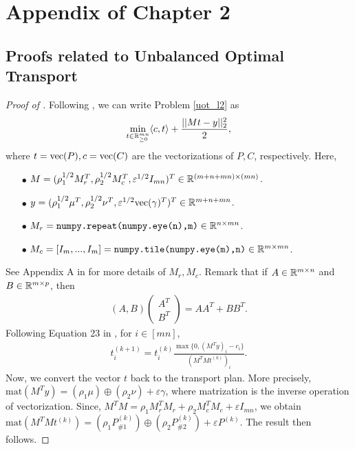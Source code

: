 \section{Appendix of Chapter 2}

\subsection{Proofs related to Unbalanced Optimal Transport} \label{appendix:subsec_uot}

\begin{proof}[Proof of ]
Following \citep{Chapel21}, we can write Problem \eqref{uot_l2} as
\begin{align}
    \min_{t \in \mathbb R^{mn}_{\geq 0}} \langle c, t \rangle + \frac{|| Mt - y ||_2^2}{2},
\end{align}
where $t = \text{vec}(P), c = \text{vec}(C)$ are the vectorizations of $P, C$, respectively. Here,
\begin{itemize}
    \item[$\bullet$] $M = (\rho_1^{1/2} M_r^T, \rho_2^{1/2} M_c^T, \varepsilon^{1/2} I_{mn})^T \in \mathbb R^{(m + n + mn) \times (mn)}$.

    \item[$\bullet$] $y = (\rho_1^{1/2} \mu^T, \rho_2^{1/2} \nu^T, \varepsilon^{1/2} \text{vec}(\gamma)^T)^T \in \mathbb R^{m + n + mn}$.

    \item[$\bullet$] $M_r = \texttt{numpy.repeat(numpy.eye(n),m)} \in \mathbb R^{n \times mn}$.

    \item[$\bullet$] $M_c = [I_m, ..., I_m] = \texttt{numpy.tile(numpy.eye(m),n)} \in \mathbb R^{m \times mn}$.
\end{itemize}
See Appendix A in \citep{Chapel21} for more details of $M_r, M_c$.
Remark that if $A \in \mathbb R^{m \times n}$ and $B \in \mathbb R^{m \times p}$, then
\begin{align}
    (A, B) \begin{pmatrix}
        A^T \\
        B^T
    \end{pmatrix}
    = A A^T + B B^T.
\end{align}
Following Equation 23 in \citep{Chapel21}, for $i \in [mn]$,
\begin{align}
    t^{(k+1)}_i = t^{(k)}_i \frac{\max \big\{ 0, (M^T y)_i - c_i \big\}}{(M^T M t^{(k)})_i}.
\end{align}
Now, we convert the vector $t$ back to the transport plan. More precisely,
$\text{mat}(M^T y) = (\rho_1 \mu) \oplus (\rho_2 \nu) + \varepsilon \gamma$,
where matrization is the inverse operation of vectorization. Since,
$M^T M = \rho_1 M_r^T M_r + \rho_2 M_c^T M_c + \varepsilon I_{mn}$, we obtain
$\text{mat}(M^T M t^{(k)}) = (\rho_1 P_{\# 1}^{(k)}) \oplus (\rho_2 P_{\# 2}^{(k)})
+ \varepsilon P^{(k)} $. The result then follows.
\end{proof}

